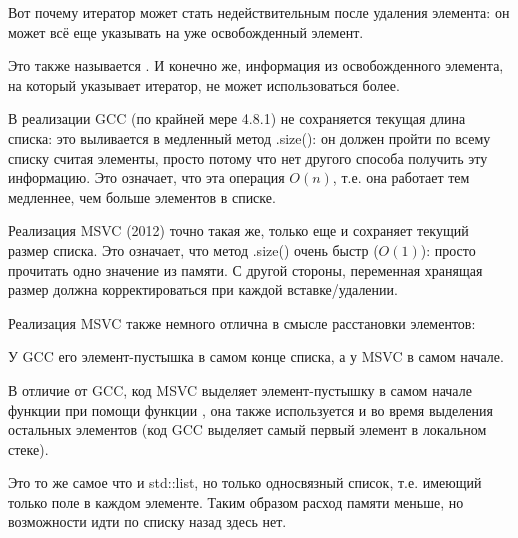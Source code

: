 Вот почему итератор может стать недействительным после удаления элемента:
он может всё еще указывать на уже освобожденный элемент.

Это также называется .
И конечно же, информация из освобожденного элемента, на который указывает итератор, 
не может использоваться более.

В реализации GCC (по крайней мере 4.8.1) не сохраняется текущая длина списка: это выливается в медленный
метод .size(): он должен пройти по всему списку считая элементы, просто потому что нет
другого способа получить эту информацию.
Это означает, что эта операция $O(n)$, т.е. она работает тем медленнее, чем больше элементов в списке.





\label{MSVC_std_list}

Реализация MSVC (2012) точно такая же, только еще и сохраняет текущий размер списка.
Это означает, что метод .size() очень быстр ($O(1)$): просто прочитать одно значение из памяти.
С другой стороны, переменная хранящая размер должна корректироваться при каждой вставке/удалении.

Реализация MSVC также немного отлична в смысле расстановки элементов:



У GCC его элемент-пустышка в самом конце списка, а у MSVC в самом начале.



В отличие от GCC, код MSVC выделяет элемент-пустышку в самом начале функции при помощи
функции , она также используется и во время выделения остальных элементов
(код GCC выделяет самый первый элемент в локальном стеке).




Это то же самое что и std::list, но только односвязный список, т.е. имеющий только поле  в каждом
элементе.
Таким образом расход памяти меньше, но возможности идти по списку назад здесь нет.

